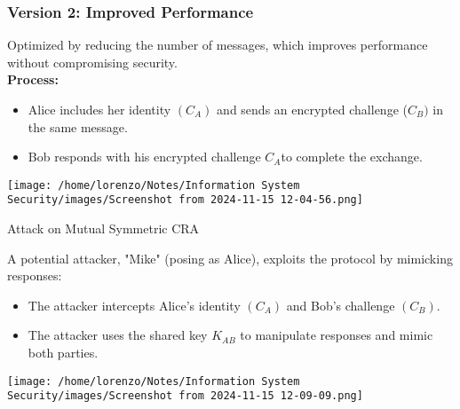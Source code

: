 \subsubsection{Version 2: Improved Performance}
\begin{minipage}{0.5\textwidth}
    Optimized by reducing the number of messages, which improves performance without compromising security.
    \\ \textbf{Process:}
    \begin{itemize}
        \item Alice includes her identity \((C_A)\) and sends an encrypted challenge (\(C_B)\) in the same message.
        \item Bob responds with his encrypted challenge \(C_A\)to complete the exchange.
    \end{itemize} 

\end{minipage} 
\hspace{0cm}
\begin{minipage}{0.5\textwidth}
    \centering
    \texttt{[image: /home/lorenzo/Notes/Information System Security/images/Screenshot from 2024-11-15 12-04-56.png]}
\end{minipage}

\begin{quotebox}[colframe=blue!10!white, colback=blue!5!white]{Attack on Mutual Symmetric CRA}
    \begin{minipage}{0.5\textwidth}
        \vspace{-0.5cm}
        A potential attacker, "Mike" (posing as Alice), exploits the protocol by mimicking responses:
        \begin{itemize}
            \item The attacker intercepts Alice's identity \((C_A)\) and Bob's challenge \((C_B)\).
            \item The attacker uses the shared key \(K_{AB}\) to manipulate responses and mimic both parties.
        \end{itemize}
    \end{minipage} 
    \hspace{1cm}
    \begin{minipage}{0.3\textwidth}
        \centering
        \texttt{[image: /home/lorenzo/Notes/Information System Security/images/Screenshot from 2024-11-15 12-09-09.png]}
    \end{minipage}
\end{quotebox}

